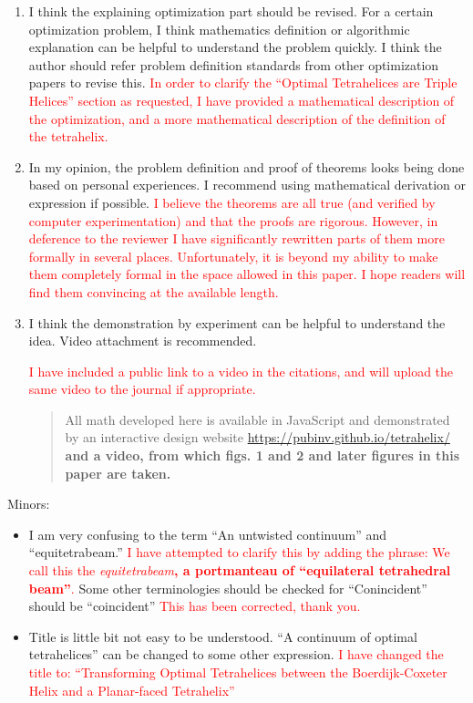 \documentclass{article}
\newcommand{\highlighttext}[1] {\textcolor{red}{#1}}
\begin{document}
\begin{enumerate}
  \item
    I think the explaining optimization part should be revised. For a certain optimization problem, I think mathematics definition or algorithmic explanation can be helpful to understand the problem quickly. I think the author should refer problem definition standards from other optimization papers to revise this.
    \highlighttext{
      In order to clarify the ``Optimal Tetrahelices are Triple Helices'' section as requested,
      I have provided a mathematical description of the optimization, and a more mathematical
      description of the definition of the tetrahelix.
      }


  \item    
    In my opinion, the problem definition and proof of theorems looks being done based on personal experiences. I recommend using mathematical derivation or expression if possible.
    \highlighttext{
      I believe the theorems are all true (and verified by computer experimentation) and that the proofs
      are rigorous. However, in deference to the reviewer I have significantly rewritten parts of them
      more formally in several places. Unfortunately, it is beyond my ability to make them completely formal
      in the space allowed in this paper. I hope readers will find them convincing at the available length.
      }

  \item    
    I think the demonstration by experiment can be helpful to understand the idea. Video attachment is recommended.
    \highlighttext{
I have included a public link to a video\cite{tetrahelixvideo} in the citations, and will upload the same video to the journal if appropriate.
\begin{quote}All math
developed here is available in JavaScript and demonstrated by an interactive
design website \url{https://pubinv.github.io/tetrahelix/}\cite{readtetrahelix}
\bf{and a video\cite{tetrahelixvideo}},
from which figs. 1 and 2 and later figures in this paper 
are taken.      
\end{quote}
    }

\end{enumerate}

Minors:

\begin{itemize}
  \item
    I am very confusing to the term ``An untwisted continuum'' and ``equitetrabeam.''
    \highlighttext{I have attempted to clarify this by adding the phrase:
      We call this the \emph{equitetrabeam}\textbf{, a portmanteau of ``equilateral tetrahedral beam''}.}
    Some other terminologies should be checked for 
    “Conincident” should be “coincident”
    \highlighttext{This has been corrected, thank you.}
\item
  Title is little bit not easy to be understood. “A continuum of optimal tetrahelices” can be changed to some other expression.
  \highlighttext{
    I have changed the title to:
 ``Transforming Optimal Tetrahelices between the Boerdijk-Coxeter Helix and a Planar-faced Tetrahelix''
}
\end{itemize}




\end{document}
